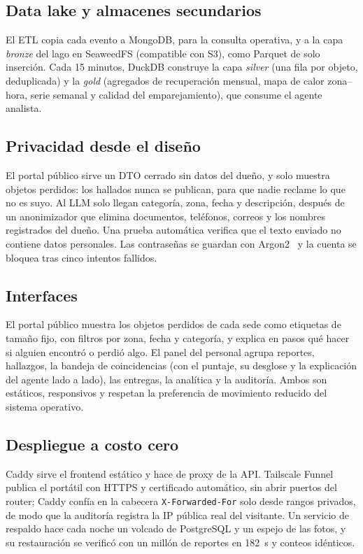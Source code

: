 \documentclass[conference]{IEEEtran}
\begin{document}
\subsection{Data lake y almacenes secundarios}
El ETL copia cada evento a MongoDB, para la consulta operativa, y a la capa \emph{bronze} del lago en SeaweedFS (compatible con S3), como Parquet de solo inserción. Cada 15 minutos, DuckDB construye la capa \emph{silver} (una fila por objeto, deduplicada) y la \emph{gold} (agregados de recuperación mensual, mapa de calor zona--hora, serie semanal y calidad del emparejamiento), que consume el agente analista.

\subsection{Privacidad desde el diseño}
El portal público sirve un DTO cerrado sin datos del dueño, y solo muestra objetos perdidos: los hallados nunca se publican, para que nadie reclame lo que no es suyo. Al LLM solo llegan categoría, zona, fecha y descripción, después de un anonimizador que elimina documentos, teléfonos, correos y los nombres registrados del dueño. Una prueba automática verifica que el texto enviado no contiene datos personales. Las contraseñas se guardan con Argon2~\cite{biryukov2016argon2} y la cuenta se bloquea tras cinco intentos fallidos.

\subsection{Interfaces}
El portal público muestra los objetos perdidos de cada sede como etiquetas de tamaño fijo, con filtros por zona, fecha y categoría, y explica en pasos qué hacer si alguien encontró o perdió algo. El panel del personal agrupa reportes, hallazgos, la bandeja de coincidencias (con el puntaje, su desglose y la explicación del agente lado a lado), las entregas, la analítica y la auditoría. Ambos son estáticos, responsivos y respetan la preferencia de movimiento reducido del sistema operativo.

\subsection{Despliegue a costo cero}
Caddy sirve el frontend estático y hace de proxy de la API. Tailscale Funnel publica el portátil con HTTPS y certificado automático, sin abrir puertos del router; Caddy confía en la cabecera \texttt{X-Forwarded-For} solo desde rangos privados, de modo que la auditoría registra la IP pública real del visitante. Un servicio de respaldo hace cada noche un volcado de PostgreSQL y un espejo de las fotos, y su restauración se verificó con un millón de reportes en 182~s y conteos idénticos.
\end{document}

